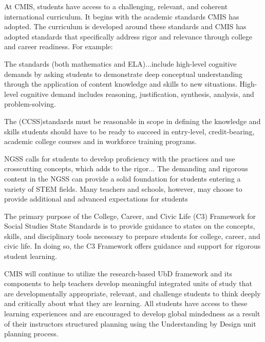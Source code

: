 
\begin{findings}

At CMIS, students have access to a challenging, relevant, and coherent international curriculum. It begins with the academic  standards CMIS has adopted. The curriculum is developed around these standards and CMIS has adopted standards that specifically address rigor and relevance through college and career readiness. For example: 

The standards (both mathematics and ELA)...include high-level cognitive demands by asking students to demonstrate deep conceptual understanding through the application of content knowledge and skills to new situations. High-level cognitive demand includes reasoning, justification, synthesis, analysis, and problem-solving.

The (CCSS)standards must be reasonable in scope in defining the knowledge and skills students should have to be ready to succeed in entry-level, credit-bearing, academic college courses and in workforce training programs.

NGSS calls for students to develop proficiency with the practices and use crosscutting concepts, which adds to the rigor... The demanding and rigorous content in the NGSS can provide a solid foundation for students entering a variety of STEM fields. Many teachers and schools, however, may choose to provide additional and advanced expectations for students

The primary purpose of the College, Career, and Civic Life (C3) Framework for Social Studies State Standards is to provide guidance to states on the concepts, skills, and disciplinary tools necessary to prepare students for college, career, and civic life. In doing so, the C3 Framework offers guidance and support for rigorous student learning.


CMIS will continue to utilize the research-based UbD framework and its components to help teachers develop meaningful integrated units of study  that are developmentally appropriate, relevant, and challenge students to think deeply and critically about what they are learning. All students have access to these learning experiences and are encouraged to develop global mindedness as a result of their instructors structured planning using the Understanding by Design unit planning process. 


\end{findings}
